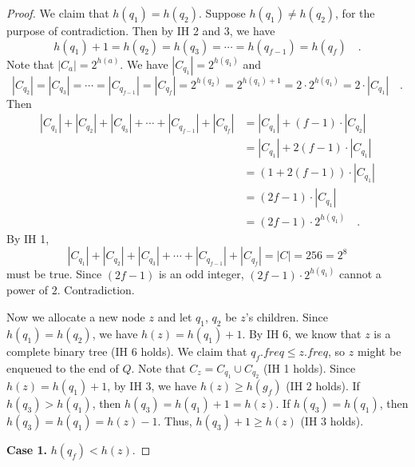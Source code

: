\begin{proof}
    We claim that $h(q_1) = h(q_2)$.
    Suppose $h(q_1) \neq h(q_2)$, for the purpose of contradiction.
    Then by IH 2 and 3, we have
    \begin{equation*}
        h(q_1) + 1 = h(q_2) = h(q_3) = \cdots = h(q_{f-1}) = h(q_f)
        \quad .
    \end{equation*}
    Note that $|C_a| = 2^{h(a)}$.
    We have $|C_{q_1}| = 2^{h(q_1)}$ and 
    \begin{equation*}
        |C_{q_2}| = |C_{q_3}| = \cdots = |C_{q_{f-1}}| = |C_{q_f}|
        = 2^{h(q_2)} = 2^{h(q_1) + 1} = 2 \cdot 2^{h(q_1)}
        = 2 \cdot |C_{q_1}|
        \quad .
    \end{equation*}
    Then
    \begin{equation*}
    \begin{split}
        |C_{q_1}| + |C_{q_2}| + |C_{q_3}| + \cdots + |C_{q_{f-1}}| + |C_{q_f}|
        & = |C_{q_1}| + (f - 1) \cdot |C_{q_2}| \\
        & = |C_{q_1}| + 2(f - 1) \cdot |C_{q_1}| \\
        & = (1 + 2(f - 1)) \cdot |C_{q_1}| \\
        & = (2f - 1) \cdot |C_{q_1}| \\
        & = (2f - 1) \cdot 2^{h(q_1)}
        \quad .
    \end{split}
    \end{equation*}
    By IH 1, 
    \begin{equation*}
        |C_{q_1}| + |C_{q_2}| + |C_{q_3}| + \cdots + |C_{q_{f-1}}| + |C_{q_f}|
        = |C| = 256 = 2^8
    \end{equation*}
    must be true.
    Since $(2f - 1)$ is an odd integer,
    $(2f - 1) \cdot 2^{h(q_1)}$ cannot a power of $2$.
    Contradiction.

    Now we allocate a new node $z$ and let $q_1$, $q_2$ be $z$'s children.
    Since $h(q_1) = h(q_2)$, we have $h(z) = h(q_1) + 1$.
    By IH 6, we know that $z$ is a complete binary tree (IH 6 holds).
    We claim that $q_f.freq \leq z.freq$,
    so $z$ might be enqueued to the end of $Q$.
    Note that $C_z = C_{q_1} \cup C_{q_2}$ (IH 1 holds).
    Since $h(z) = h(q_1) + 1$, by IH 3, we have $h(z) \geq h(g_f)$ 
    (IH 2 holds).
    If $h(q_3) > h(q_1)$, then $h(q_3) = h(q_1) + 1 = h(z)$.
    If $h(q_3) = h(q_1)$, then $h(q_3) = h(q_1) = h(z) - 1$.
    Thus, $h(q_3) + 1 \geq h(z)$ (IH 3 holds).

    \textbf{Case 1.}
    $h(q_f) < h(z)$.


\end{proof}
